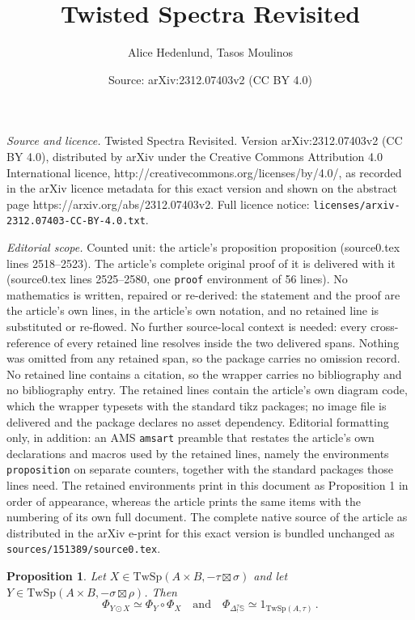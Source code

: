 \documentclass[10pt,a4paper]{amsart}
\title{Twisted Spectra Revisited}
\author{Alice Hedenlund, Tasos Moulinos}
\date{Source: arXiv:2312.07403v2 (CC BY 4.0)}
\newtheorem{proposition}{Proposition}
\newcommand{\TwSp}{\mathrm{TwSp}}
\newcommand{\bS}{\mathbb{S}}
\newcommand{\och}{\quad \text{and} \quad}
\begin{document}
\maketitle

\noindent\emph{Source and licence.} Twisted Spectra Revisited. Version arXiv:2312.07403v2 (CC BY 4.0), distributed by arXiv under the Creative Commons Attribution 4.0 International licence, http://creativecommons.org/licenses/by/4.0/, as recorded in the arXiv licence metadata for this exact version and shown on the abstract page https://arxiv.org/abs/2312.07403v2. Full licence notice: \texttt{licenses/arxiv-2312.07403-CC-BY-4.0.txt}.\par\smallskip

\noindent\textit{Editorial scope.} Counted unit: the article's proposition proposition (source0.tex lines 2518--2523). The article's complete original proof of it is delivered with it (source0.tex lines 2525--2580, one \texttt{proof} environment of 56 lines). No mathematics is written, repaired or re-derived: the statement and the proof are the article's own lines, in the article's own notation, and no retained line is substituted or re-flowed.  No further source-local context is needed: every cross-reference of every retained line resolves inside the two delivered spans.  Nothing was omitted from any retained span, so the package carries no omission record.  No retained line contains a citation, so the wrapper carries no bibliography and no bibliography entry.  The retained lines contain the article's own diagram code, which the wrapper typesets with the standard tikz packages; no image file is delivered and the package declares no asset dependency.  Editorial formatting only, in addition: an AMS \texttt{amsart} preamble that restates the article's own declarations and macros used by the retained lines, namely the environments \texttt{proposition} on separate counters, together with the standard packages those lines need.  The retained environments print in this document as Proposition 1 in order of appearance, whereas the article prints the same items with the numbering of its own full document.  The complete native source of the article as distributed in the arXiv e-print for this exact version is bundled unchanged as \texttt{sources/151389/source0.tex}.
\begin{proposition}
  Let $X \in \TwSp(A \times B , -\tau \boxtimes \sigma)$ and let $Y \in \TwSp(A \times B, -\sigma \boxtimes \rho)$. Then
  \[
  \Phi_{Y \odot X} \simeq \Phi_{Y} \circ \Phi_{X} \och \Phi_{\Delta^{\tau}_! \bS} \simeq 1_{\TwSp(A,\tau)} \,.
  \]
\end{proposition}
\end{document}
